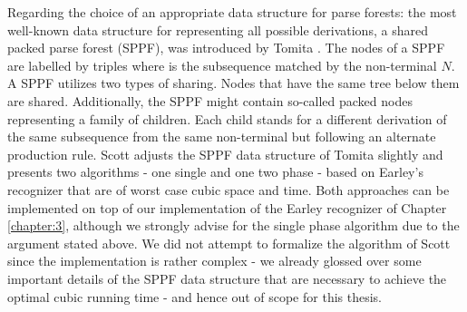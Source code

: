 \begin{isabellebody}
\begin{isamarkuptext}
Regarding the choice of an appropriate data structure for parse forests: the most well-known data structure for representing all possible derivations, a shared packed parse
forest (SPPF), was introduced by Tomita \cite{Tomita:1985}. The nodes of a SPPF are labelled by
triples  where  is the subsequence matched by the non-terminal $N$.
A SPPF utilizes two types of sharing. Nodes that have the same tree below them are shared. Additionally,
the SPPF might contain so-called packed nodes representing a family of children. Each child stands for
a different derivation of the same subsequence  from the same non-terminal but following an
alternate production rule. Scott \cite{Scott:2008} adjusts the SPPF data structure of Tomita slightly
and presents two algorithms - one single and one two phase - based on Earley's recognizer that are of
worst case cubic space and time. Both approaches can be implemented on top of our implementation of
the Earley recognizer of Chapter \ref{chapter:3}, although we strongly advise for the single phase algorithm
due to the argument stated above. We did not attempt to formalize the algorithm of Scott since the
implementation is rather complex - we already glossed over some important details of the SPPF data structure
that are necessary to achieve the optimal cubic running time - and hence out of scope for this thesis.%
\end{isamarkuptext}\isamarkuptrue%
%
\isadelimtheory
%
\endisadelimtheory
%
\isatagtheory
%
\endisatagtheory
{\isafoldtheory}%
%
\isadelimtheory
%
\endisadelimtheory
%
\end{isabellebody}%
\endinput

